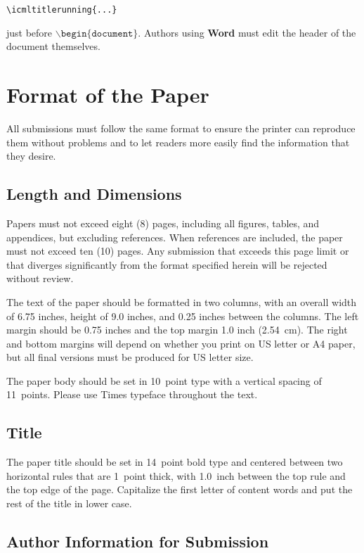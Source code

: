 \documentclass{article}
\begin{document}
\verb|\icmltitlerunning{...}|

just before $\mathtt{\backslash begin\{document\}}$.
Authors using \textbf{Word} must edit the header of the document themselves.

\section{Format of the Paper} 
 
All submissions must follow the same format to ensure the printer can
reproduce them without problems and to let readers more easily find
the information that they desire.

\subsection{Length and Dimensions}

Papers must not exceed eight (8) pages, including all figures, tables,
and appendices, but excluding references. When references are included,
the paper must not exceed ten (10) pages. Any submission that exceeds 
this page limit or that diverges significantly from the format specified 
herein will be rejected without review.

The text of the paper should be formatted in two columns, with an
overall width of 6.75 inches, height of 9.0 inches, and 0.25 inches
between the columns. The left margin should be 0.75 inches and the top
margin 1.0 inch (2.54~cm). The right and bottom margins will depend on
whether you print on US letter or A4 paper, but all final versions
must be produced for US letter size.

The paper body should be set in 10~point type with a vertical spacing
of 11~points. Please use Times typeface throughout the text.

\subsection{Title}

The paper title should be set in 14~point bold type and centered
between two horizontal rules that are 1~point thick, with 1.0~inch
between the top rule and the top edge of the page. Capitalize the
first letter of content words and put the rest of the title in lower
case.

\subsection{Author Information for Submission}
\label{author info}
\end{document}
